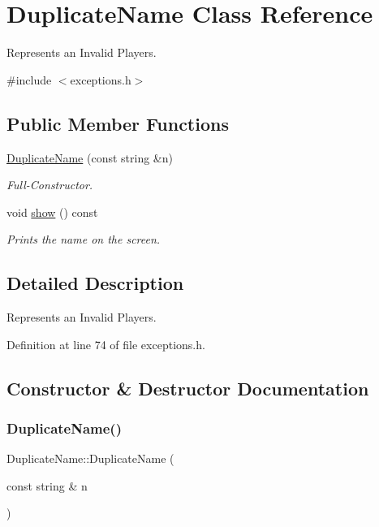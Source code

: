 \hypertarget{class_duplicate_name}{}\section{Duplicate\+Name Class Reference}
\label{class_duplicate_name}


Represents an Invalid Players.  




{\ttfamily \#include $<$exceptions.\+h$>$}

\subsection*{Public Member Functions}
\begin{DoxyCompactItemize}
\item 
\hyperlink{class_duplicate_name_a09b45905e407bc63fa159cbbe27b7c27}{Duplicate\+Name} (const string \&n)
\begin{DoxyCompactList}\small\item\em Full-\/\+Constructor. \end{DoxyCompactList}\item 
void \hyperlink{class_duplicate_name_a65a60c94f9cf8d06e8fbf81559741d65}{show} () const
\begin{DoxyCompactList}\small\item\em Prints the name on the screen. \end{DoxyCompactList}\end{DoxyCompactItemize}


\subsection{Detailed Description}
Represents an Invalid Players. 

Definition at line 74 of file exceptions.\+h.



\subsection{Constructor \& Destructor Documentation}
\hypertarget{class_duplicate_name_a09b45905e407bc63fa159cbbe27b7c27}{}\label{class_duplicate_name_a09b45905e407bc63fa159cbbe27b7c27} 
\subsubsection{\texorpdfstring{Duplicate\+Name()}{DuplicateName()}}
{\footnotesize\ttfamily Duplicate\+Name\+::\+Duplicate\+Name (\begin{DoxyParamCaption}\item[{const string \&}]{n }\end{DoxyParamCaption})\hspace{0.3cm}{\ttfamily [inline]}}



